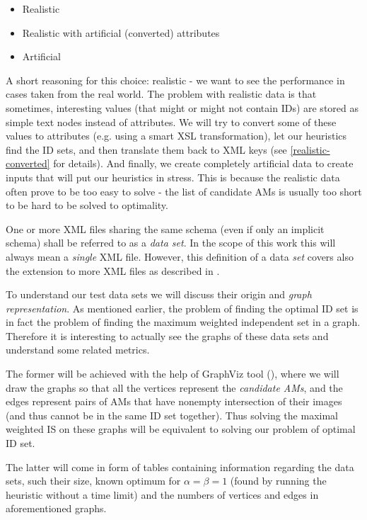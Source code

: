 \begin{itemize}
	\item Realistic
	\item Realistic with artificial (converted) attributes
	\item Artificial
\end{itemize}

A short reasoning for this choice: realistic - we want to see the performance in cases taken from the real world. The problem with realistic data is that sometimes, interesting values (that might or might not contain IDs) are stored as simple text nodes instead of attributes. We will try to convert some of these values to attributes (e.g. using a smart XSL transformation), let our heuristics find the ID sets, and then translate them back to XML keys (see \ref{realistic-converted} for details).
And finally, we create completely artificial data to create inputs that will put our heuristics in stress. This is because the realistic data often prove to be too easy to solve - the list of candidate AMs is usually too short to be hard to be solved to optimality.

\begin{define}
	\label{define-data-set}
	One or more XML files sharing the same schema (even if only an implicit schema) shall be referred to as a \textit{data set}. In the scope of this work this will always mean a \textit{single} XML file. However, this definition of a data \textit{set} covers also the extension to more XML files as described in \cite{fidax}.
\end{define}

To understand our test data sets we will discuss their origin and \textit{graph representation}. As mentioned earlier, %
the problem of finding the optimal ID set is in fact the problem of finding the maximum weighted independent set in a graph. Therefore it is interesting to actually see the graphs of these data sets and understand some related metrics.

The former will be achieved with the help of GraphViz tool (\cite{graphviz}), where we will draw the graphs so that all the vertices represent the \textit{candidate AMs}, and the edges represent pairs of AMs that have nonempty intersection of their images (and thus cannot be in the same ID set together). Thus solving the maximal weighted IS on these graphs will be equivalent to solving our problem of optimal ID set.

The latter will come in form of tables containing information regarding the data sets, such their size, known optimum for $\alpha = \beta = 1$ (found by running the  heuristic without a time limit) and the numbers of vertices and edges in aforementioned graphs.


